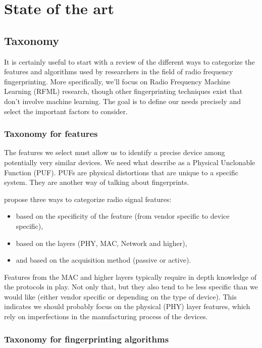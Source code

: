 \section{State of the art} \label{sota}

\subsection{Taxonomy}

It is certainly useful to start with a review of the different ways to categorize the features and algorithms used by researchers in the field of radio frequency fingerprinting. More specifically, we'll focus on Radio Frequency Machine Learning (RFML) research, though other fingerprinting techniques exist that don't involve machine learning. The goal is to define our needs precisely and select the important factors to consider.

\subsubsection{Taxonomy for features} \label{features_tax}

The features we select must allow us to identify a precise device among potentially very similar devices. We need what \textcite{delgado_passive_2020} describe as a Physical Unclonable Function (PUF). PUFs are physical distortions that are unique to a specific system. They are another way of talking about fingerprints.

\textcite{xu_device_2015} propose three ways to categorize radio signal features:

\begin{itemize}
  \item based on the specificity of the feature (from vendor specific to device specific),
  \item based on the layers (PHY, MAC, Network and higher),
  \item and based on the acquisition method (passive or active).
\end{itemize}

Features from the MAC and higher layers typically require in depth knowledge of the protocols in play. Not only that, but they also tend to be less specific than we would like (either vendor specific or depending on the type of device). This indicates we should probably focus on the physical (PHY) layer features, which rely on imperfections in the manufacturing process of the devices.

\subsubsection{Taxonomy for fingerprinting algorithms} \label{algo-taxo}

